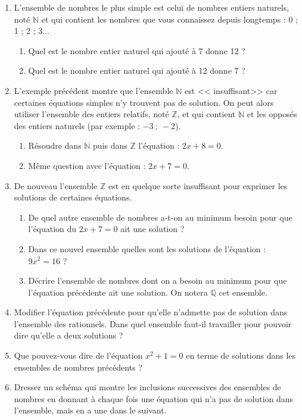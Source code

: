\begin{lemma}
\begin{enumerate}
        \item L'ensemble de nombres le plus simple est celui de nombres entiers naturels, noté $\mathbb{N}$ et qui contient les nombres que vous connaissez depuis longtemps : $0$ ; 1 ; 2 ; 3...
        \begin{enumerate}
            \item Quel est le nombre entier naturel qui ajouté à 7 donne 12 ?
            \item Quel est le nombre entier naturel qui ajouté à 12 donne 7 ?
        \end{enumerate}
        \item L'exemple précédent montre que l'ensemble $\mathbb{N}$ est << insuffisant>>  car certaines équations simples n'y trouvent pas de solution. On peut alors utiliser l'ensemble des entiers relatifs, noté $\mathbb{Z}$, et qui contient $\mathbb{N}$ et les opposés des entiers naturels (par exemple : $-3~;~ -2$).
        \begin{enumerate}
            \item  Résoudre dans $\mathbb{N}$ puis dans $\mathbb{Z}$ l'équation : $2x+8=0$.
            \item  Même question avec l'équation : $2x+7=0$.
        \end{enumerate}
        \item De nouveau l'ensemble $\mathbb{Z}$ est en quelque sorte insuffisant pour exprimer les solutions de certaines équations.
        \begin{enumerate}
            \item De quel autre ensemble de nombres a-t-on au minimum besoin pour que l'équation du $2x+7=0$ ait une solution ?
            \item Dans ce nouvel ensemble quelles sont les solutions de l'équation : $9x^2=16$ ?
            \item Décrire l'ensemble de nombres dont on a besoin au minimum pour que l'équation précédente ait une solution. On notera $\mathbb{Q}$ cet ensemble.
        \end{enumerate}
        \item Modifier l'équation précédente pour qu'elle n'admette pas de solution dans l'ensemble des rationnels. Dans quel ensemble faut-il travailler pour pouvoir dire qu'elle a deux solutions ?
        \item Que pouvez-vous dire de l'équation  $x^2+1=0$ en terme de solutions dans les ensembles de nombres précédents ?
        \item Dresser un schéma qui montre les inclusions successives des
ensembles de nombres en donnant à chaque fois une équation qui n'a pas de solution dans
l'ensemble, mais en a une dans le suivant.
\end{enumerate}
\end{lemma}
